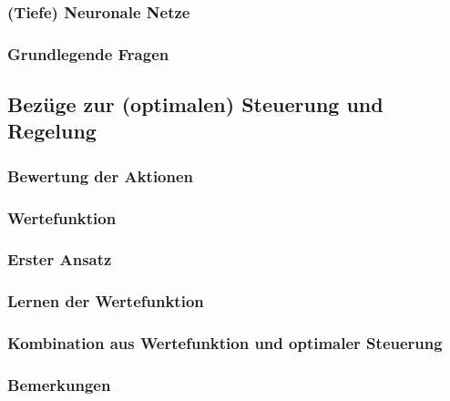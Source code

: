 			\subsubsection{(Tiefe) Neuronale Netze} %

			\subsubsection{Grundlegende Fragen} %

		\subsection{Bezüge zur (optimalen) Steuerung und Regelung} %

			\subsubsection{Bewertung der Aktionen} %

			\subsubsection{Wertefunktion} %

			\subsubsection{Erster Ansatz} %

			\subsubsection{Lernen der Wertefunktion} %

			\subsubsection{Kombination aus Wertefunktion und optimaler Steuerung} %

			\subsubsection{Bemerkungen} %
